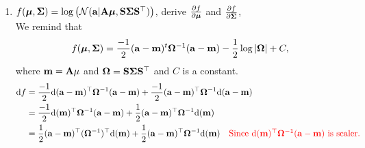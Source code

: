 \documentclass[12pt, fullpage,letterpaper]{article}
\def\red{\color{red}}
\def\blackblue{\color{black!40!blue}}
\begin{document}
\begin{enumerate}
\begin{enumerate}
	\item $f(\boldsymbol{\mu}, \boldsymbol{\Sigma}) = \log\big(\mathcal{N}({\bf a}|{\bf A}\boldsymbol{\mu}, {\bf S}\boldsymbol{\Sigma}{\bf S}^\top)\big)$, derive $\frac{\partial f}{\partial \boldsymbol{\mu}}$ and $\frac{\partial f}{\partial \boldsymbol{\Sigma}}$,\\
	{\blackblue\noindent  
	We remind that 
	$$f(\boldsymbol{\mu}, \boldsymbol{\Sigma}) = \frac{-1}{2}({\bf a}-{\bf m})^t\mathbf{\Omega}^{-1}({\bf a}-{\bf m}) -{1\over 2}\log |\mathbf{\Omega}| +C,$$
	where   ${\bf m} =  {\bf A}\mu$ and $\mathbf{\Omega} = {\bf S}\boldsymbol{\Sigma}{\bf S}^\top$ and $C$ is a constant.
	\begin{align*}
	\d f
	& = \frac{-1}{2}\d(\a-\m)^\top\bOmega^{-1}(\a-\m) + \frac{-1}{2}(\a-\m)^\top\bOmega^{-1}\d(\a-\m) \\
	& = \frac{-1}{2}\d(\m)^\top\bOmega^{-1}(\a-\m) + \frac{1}{2}(\a-\m)^\top\bOmega^{-1}\d(\m)\\
	& = \frac{1}{2}(\a-\m)^\top(\bOmega^{-1})^\top\d(\m)+ \frac{1}{2}(\a-\m)^\top\bOmega^{-1}\d(\m) \quad\mbox{\red Since $\d(\m)^\top\bOmega^{-1}(\a-\m)$ is scaler.}\\

\end{align*}}
\end{enumerate}
\end{enumerate}
\end{document}
